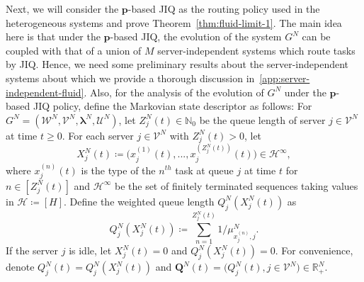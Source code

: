 \documentclass[11pt, reqno]{article}
\numberwithin{equation}{section}
\numberwithin{theorem}{section}
\newcommand{\R}{\mathbb{R}}                 %
\newcommand{\N}{\mathbb{N}}                 %
\begin{document}
Next, we will consider the $\mathbf{p}$-based JIQ as the routing policy used in the heterogeneous systems and prove Theorem~\ref{thm:fluid-limit-1}. 
The main idea here is that under the $\mathbf{p}$-based JIQ, the evolution of the system $G^N$ can be coupled with that of a union of $M$ server-independent systems which route tasks by JIQ. Hence, we need some preliminary results about the server-independent systems about which we provide a thorough discussion in~\ref{app:server-independent-fluid}. 
Also, for the analysis of the evolution of $G^N$ under the $\mathbf{p}$-based JIQ policy, define the Markovian state descriptor as follows: 
For $G^N=(\mathcal{W}^N,\mathcal{V}^N,\boldsymbol\lambda^N,\mathcal{U}^N)$, let $Z^N_j(t)\in\N_0$ be the queue length of server $j\in \mathcal{V}^N$ at time $t\geq 0$. For each server $j\in\mathcal{V}^N$ with $Z^N_j(t)>0$, let 
\begin{equation}\label{defn:queue-of-j}
    X^N_j(t)\coloneqq\Big(x^{(1)}_j(t),...,x^{(Z^N_j(t))}_j(t)\Big)\in\mathcal{H}^{\infty},
\end{equation}
where $x^{(n)}_j(t)$ is the type of the $n^{th}$ task at queue $j$ at time $t$ for $n\in[Z^N_j(t)]$ and $\mathcal{H}^{\infty}$ be the set of finitely terminated
sequences taking values in $\mathcal{H}\coloneqq[H]$. Define the weighted queue length $Q^N_j(X^N_j(t))$ as 
\begin{equation}\label{defn:weighted-queue-length}
    Q^N_j(X^N_j(t))\coloneqq\sum_{n=1}^{Z^N_j(t)}1/\mu^N_{x^{(n)}_j,j}.
\end{equation}
If the server $j$ is idle, let $X^N_j(t)=0$ and $Q^N_j(X^N_j(t))=0$. For convenience, denote $Q^N_j(t)=Q^N_j(X^N_j(t))$ and $\mathbf{Q}^N(t)=\big(Q^N_j(t),j\in\mathcal{V}^N\big)\in\R_+^{N}$. 
\end{document}
